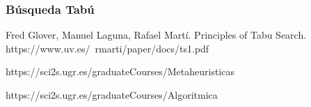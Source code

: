\documentclass{article}
\begin{document}
		\subsubsection{Búsqueda Tabú}
	
	


	\begin{thebibliography}{0}
		
		 Fred Glover, Manuel Laguna, Rafael Martí. Principles of Tabu Search. https://www.uv.es/~rmarti/paper/docs/ts1.pdf
		
		 https://sci2s.ugr.es/graduateCourses/Metaheuristicas
		
		https://sci2s.ugr.es/graduateCourses/Algoritmica
		
	\end{thebibliography}
\end{document}
